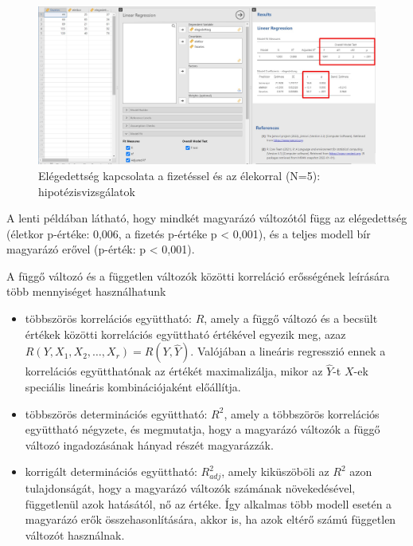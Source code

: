 \documentclass[
  letterpaper,
]{krantz}
\begin{document}
\begin{figure}

{\centering \includegraphics{./images/lin_reg_fizetes_eletkor_elegedettseg_01_kep_03.jpg}

}

\caption{Elégedettség kapcsolata a fizetéssel és az élekorral (N=5):
hipotézisvizsgálatok}

\end{figure}

A lenti példában látható, hogy mindkét magyarázó változótól függ az
elégedettség (életkor p-értéke: 0,006, a fizetés p-értéke p \textless{}
0,001), és a teljes modell bír magyarázó erővel (p-érték: p \textless{}
0,001).

A függő változó és a független változók közötti korreláció erősségének
leírására több mennyiséget használhatunk

\begin{itemize}
\item
  többszörös korrelációs együttható: \(R\), amely a függő változó és a
  becsült értékek közötti korrelációs együttható értékével egyezik meg,
  azaz \(R(Y,X_1,X_2,…,X_r )=R(Y,\hat{Y})\). Valójában a lineáris
  regresszió ennek a korrelációs együtthatónak az értékét maximalizálja,
  mikor az \(\hat{Y}\)-t \(X\)-ek speciális lineáris kombinációjaként
  előállítja.
\item
  többszörös determinációs együttható: \(R^2\), amely a többszörös
  korrelációs együttható négyzete, és megmutatja, hogy a magyarázó
  változók a függő változó ingadozásának hányad részét magyarázzák.
\item
  korrigált determinációs együttható: \(R_{adj}^2\), amely kiküszöböli
  az \(R^2\) azon tulajdonságát, hogy a magyarázó változók számának
  növekedésével, függetlenül azok hatásától, nő az értéke. Így alkalmas
  több modell esetén a magyarázó erők összehasonlítására, akkor is, ha
  azok eltérő számú független változót használnak.
\end{itemize}
\end{document}
